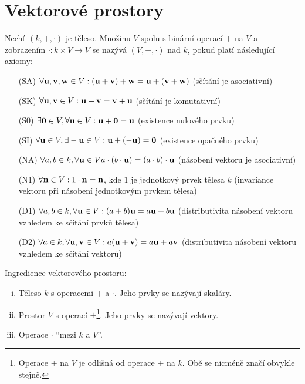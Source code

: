 \section{Vektorové prostory}

\begin{definition}
    Nechť $(k, +, \cdot)$ je těleso. Množinu $V$ spolu s binární operací $+$ na 
    $V$ a zobrazením $\cdot: k \times V \rightarrow V$ se nazývá 
     $(V, +, \cdot)$ nad $k$, pokud platí následující
    axiomy:
    \begin{enumerate}
        \item[(SA)] $\forall \mathbf{u},\mathbf{v},\mathbf{w} \in V: (\mathbf{u}+\mathbf{v})+\mathbf{w} = \mathbf{u}+(\mathbf{v}+\mathbf{w})$ 
            (sčítání je asociativní)
        \item[(SK)] $\forall \mathbf{u},\mathbf{v} \in V: \mathbf{u}+\mathbf{v} = \mathbf{v}+\mathbf{u}$ (sčítání je 
            komutativní)
        \item[(S0)] $\exists \mathbf{0} \in V,  \forall \mathbf{u} \in V: \mathbf{u}+\mathbf{0} = \mathbf{u}$ 
            (existence nulového prvku)
        \item[(SI)] $\forall \mathbf{u} \in V, \exists -\mathbf{u} \in V: \mathbf{u}+(-\mathbf{u}) = \mathbf{0}$ 
            (existence opačného prvku)
        \item[(NA)] $\forall a,b \in k, \forall \mathbf{u} \in V a \cdot (b \cdot \mathbf{u}) = 
            (a \cdot b)\cdot \mathbf{u}$ (násobení vektoru je asociativní)
        \item[(N1)] $\forall \mathbf{n} \in V: 1 \cdot \mathbf{n} = \mathbf{n}$, kde $1$ je jednotkový 
            prvek tělesa $k$ (invariance vektoru při násobení jednotkovým prvkem
            tělesa)
        \item[(D1)] $\forall a,b \in k, \forall \mathbf{u} \in V: (a + b)\mathbf{u} = a\mathbf{u} + 
            b\mathbf{u}$ (distributivita násobení vektoru vzhledem ke sčítání prvků 
            tělesa)
        \item[(D2)] $\forall a \in k, \forall \mathbf{u},\mathbf{v} \in V: a(\mathbf{u}+\mathbf{v}) = a\mathbf{u} 
            + a\mathbf{v}$ (distributivita násobení vektoru vzhledem ke sčítání vektorů)
    \end{enumerate}
\end{definition}

\begin{remark}
    Ingredience vektorového prostoru:
    \begin{enumerate}[i.]
        \item Těleso $k$ s operacemi $+$ a $\cdot$. Jeho prvky se nazývají 
            skaláry.
        \item Prostor $V$ s operací $+$\footnote{Operace $+$ na $V$ je odlišná
            od operace $+$ na $k$. Obě se nicméně značí obvykle stejně.}. 
            Jeho prvky se nazývají vektory.
        \item Operace $\cdot$ ``mezi $k$ a $V$''.
    \end{enumerate}
\end{remark}

